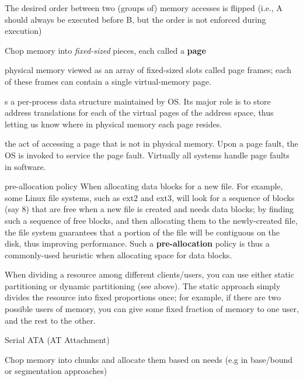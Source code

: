 \begin{description}
\item[order violation] The desired order between two (groups of) memory accesses is flipped (i.e., A should always be executed before B, but the order is not enforced during execution)

\item[paging] Chop memory into \emph{fixed-sized} pieces, each called a \textbf{page}

\item[page frame] physical memory viewed as an array of fixed-sized slots called page frames; each of these frames can contain a single virtual-memory page.

\item[page table] s a per-process data structure maintained by OS.  Its major role is to store address translations for each of the virtual pages of the address space, thus letting us know where in physical memory each page resides.

\item[page fault] the act of accessing a page that is not in physical memory.  Upon a page fault, the OS is invoked to service the page fault.  Virtually all systems handle page faults in software.

\item{pre-allocation policy} When allocating data blocks for a new file. For example, some Linux file systems, such as ext2 and ext3, will look for a sequence of blocks (say 8) that are free when a new file is created and needs data blocks; by finding such a sequence of free blocks, and then allocating them to the newly-created file, the file system guarantees that a portion of the file will be contiguous on the disk, thus improving performance. Such a \textbf{pre-allocation} policy is thus a commonly-used heuristic when allocating space for data blocks.

\item[static partitioning] When dividing a resource among different clients/users, you can use either static partitioning or dynamic partitioning (see above). The static approach simply divides the resource into fixed proportions once; for example, if there are two possible users of memory, you can give some fixed fraction of memory to one user, and the rest to the other.

\item[SATA] Serial ATA (AT Attachment)


\item[segmentation] Chop memory into  chunks and allocate them based on needs (e.g in base/bound or segmentation approaches)


\end{description}
